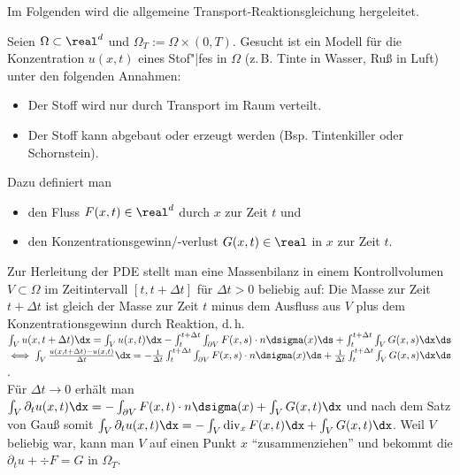 \begin{Bem}
    Im Folgenden wird die allgemeine Transport-Reaktionsgleichung hergeleitet.
    
    Seien $\Omega \subset \real^d$ und $\Omega_T := \Omega \times (0, T)$.
    Gesucht ist ein Modell für die Konzentration $u(x, t)$ eines Stof"|fes in $\Omega$
    (z.\,B. Tinte in Wasser, Ruß in Luft) unter den folgenden Annahmen:
    \begin{itemize}
        \item
        Der Stoff wird nur durch Transport im Raum verteilt.
        
        \item
        Der Stoff kann abgebaut oder erzeugt werden
        (Bsp. Tintenkiller oder Schornstein).
    \end{itemize}
    Dazu definiert man
    \begin{itemize}
        \item
        den Fluss $F(x, t) \in \real^d$ durch $x$ zur Zeit $t$ und
        
        \item
        den Konzentrationsgewinn/-verlust $G(x, t) \in \real$ in $x$ zur Zeit $t$.
    \end{itemize}
    Zur Herleitung der PDE stellt man eine Massenbilanz in einem Kontrollvolumen $V \subset \Omega$
    im Zeitintervall $[t, t + \Delta t]$ für $\Delta t > 0$ beliebig auf:
    Die Masse zur Zeit $t + \Delta t$ ist gleich der Masse zur Zeit $t$ minus dem Ausfluss aus $V$
    plus dem Konzentrationsgewinn durch Reaktion, d.\,h.
    $\int_V u(x, t + \Delta t) \dx = \int_V u(x, t) \dx -
    \int_t^{t + \Delta t} \int_{\partial V} F(x,s) \cdot n\dsigma(x) \ds +
    \int_t^{t + \Delta t} \int_V G(x, s) \dx \ds$\\
    $\iff \int_V \frac{u(x, t + \Delta t) - u(x, t)}{\Delta t} \dx =
    -\frac{1}{\Delta t} \int_t^{t + \Delta t} \int_{\partial V} F(x,s) \cdot n\dsigma(x) \ds +
    \frac{1}{\Delta t} \int_t^{t + \Delta t} \int_V G(x, s) \dx \ds$.\\
    Für $\Delta t \to 0$ erhält man
    $\int_V \partial_t u(x, t) \dx = -\int_{\partial V} F(x, t) \cdot n \dsigma(x) +
    \int_V G(x, t) \dx$ und nach dem Satz von Gauß somit
    $\int_V \partial_t u(x, t) \dx = -\int_V \div_x F(x, t) \dx + \int_V G(x, t) \dx$.
    Weil $V$ beliebig war, kann man $V$ auf einen Punkt $x$ "`zusammenziehen"' und bekommt die\\
    $\partial_t u + \div F = G$ in $\Omega_T$.
\end{Bem}

